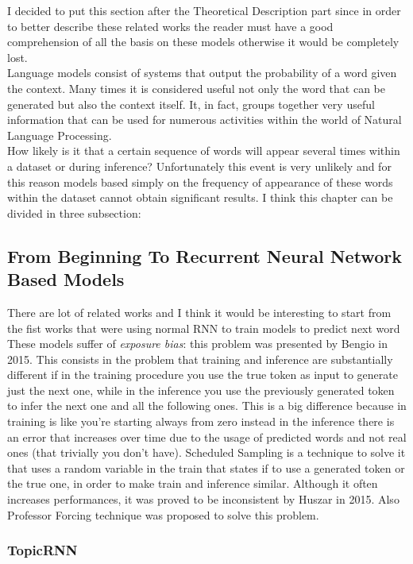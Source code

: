 I decided to put this section after the Theoretical Description part since in order to better describe these related works the reader must have a good comprehension of all the basis on these models otherwise it would be completely lost. \\ 
Language models consist of systems that output the probability of a word given the context. Many times it is considered useful not only the word that can be generated but also the context itself. It, in fact, groups together very useful information that can be used for numerous activities within the world of Natural Language Processing. \\
How likely is it that a certain sequence of words will appear several times within a dataset or during inference? Unfortunately this event is very unlikely and for this reason models based simply on the frequency of appearance of these words within the dataset cannot obtain significant results.
I think this chapter can be divided in three subsection: 
\subsection{From Beginning To Recurrent Neural Network Based Models}

There are lot of related works and I think it would be interesting to start from the fist works that were using normal RNN to train models to predict next word \cite{Bengio2003} \cite{Mikolov2010}  \\
These models suffer of \textit{exposure bias}: this problem was presented by Bengio\cite{BengioSS} in 2015. This consists in the problem that training and inference are substantially different if in the training procedure you use the true token as input to generate just the next one, while in the inference you use the previously generated token to infer the next one and all the following ones. This is a big difference because in training is like you’re starting always from zero instead in the inference there is an error that increases over time due to the usage of predicted words and not real ones (that trivially you don’t have). Scheduled Sampling is a technique to solve it that uses a random variable in the train that states if to use a generated token or the true one, in order to make train and inference similar. Although it often increases performances, it was proved to be inconsistent by Huszar in 2015.\cite{Huszar} Also Professor Forcing \cite{LambTF} technique was proposed to solve this problem.

\subsubsection[TopicRNN]{TopicRNN \cite{Dieng}}

